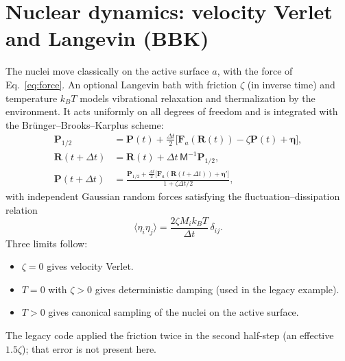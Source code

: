 \documentclass[11pt]{article}
\newcommand{\R}{\mathbf{R}}
\newcommand{\Pv}{\mathbf{P}}
\newcommand{\Mm}{\mathsf{M}}
\begin{document}
\section{Nuclear dynamics: velocity Verlet and Langevin (BBK)}
The nuclei move classically on the active surface $a$, with the force of Eq.~\eqref{eq:force}. An optional Langevin bath with friction $\zeta$ (in inverse time) and temperature $k_BT$ models vibrational relaxation and thermalization by the environment. It acts uniformly on all degrees of freedom and is integrated with the Br\"unger--Brooks--Karplus scheme:
\begin{align}
\Pv_{1/2}&=\Pv(t)+\frac{\Delta t}{2}\Big[\mathbf F_a(\R(t))-\zeta\Pv(t)+\bm\eta\Big],\\
\R(t+\Delta t)&=\R(t)+\Delta t\,\Mm^{-1}\Pv_{1/2},\\
\Pv(t+\Delta t)&=\frac{\Pv_{1/2}+\frac{\Delta t}{2}\big[\mathbf F_a(\R(t+\Delta t))+\bm\eta'\big]}{1+\zeta\Delta t/2},
\end{align}
with independent Gaussian random forces satisfying the fluctuation--dissipation relation
\begin{equation}
\langle\eta_i\eta_j\rangle=\frac{2\zeta M_i k_BT}{\Delta t}\,\delta_{ij}.
\end{equation}
Three limits follow:
\begin{itemize}
\item $\zeta=0$ gives velocity Verlet.
\item $T=0$ with $\zeta>0$ gives deterministic damping (used in the legacy example).
\item $T>0$ gives canonical sampling of the nuclei on the active surface.
\end{itemize}
The legacy code applied the friction twice in the second half-step (an effective $1.5\zeta$); that error is not present here.

\end{document}
